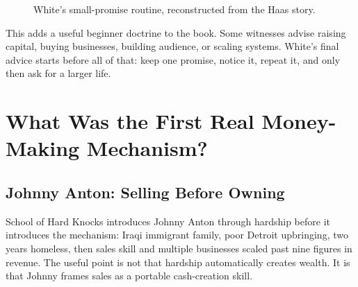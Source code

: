 \documentclass[11pt,oneside]{book}
\begin{document}
\begin{figure}
\centering
{}
\caption{White's small-promise routine, reconstructed from the Haas story.}
\end{figure}

This adds a useful beginner doctrine to the book. Some witnesses advise raising capital, buying businesses, building audience, or scaling systems. White's final advice starts before all of that: keep one promise, notice it, repeat it, and only then ask for a larger life.


\chapter{What Was the First Real Money-Making Mechanism?}

\section{Johnny Anton: Selling Before Owning}

School of Hard Knocks introduces Johnny Anton through hardship before it introduces the mechanism: Iraqi immigrant family, poor Detroit upbringing, two years homeless, then sales skill and multiple businesses scaled past nine figures in revenue. The useful point is not that hardship automatically creates wealth. It is that Johnny frames sales as a portable cash-creation skill.
\end{document}
